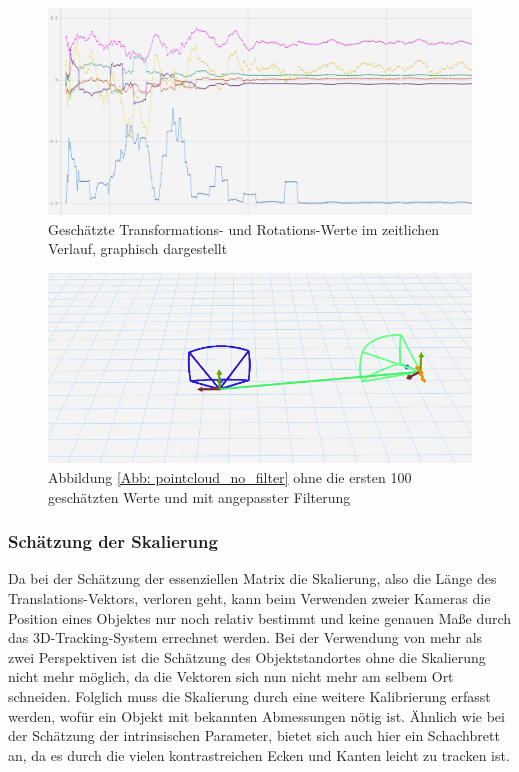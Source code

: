 \documentclass[12pt, ngerman]{article}
\begin{document}
\begin{figure}[hbtp!]
    \includegraphics[width=\textwidth]{calibration_graph_white.png}
    \caption{Geschätzte Transformations- und Rotations-Werte im zeitlichen Verlauf, graphisch dargestellt}
    \label{Abb: calibration_graph}
\end{figure}

\vspace{10pt}

\begin{figure}[hbtp!]
    \includegraphics[width=\textwidth]{pointcloud_with_filter.png}
    \caption{Abbildung \ref{Abb: pointcloud_no_filter} ohne die ersten 100 geschätzten Werte und mit angepasster Filterung}
    \label{Abb: pointcloud_with_filter}
\end{figure}

\vspace{10pt}

\subsubsection{Schätzung der Skalierung}
Da bei der Schätzung der essenziellen Matrix die Skalierung, also die Länge des
Translations-Vektors, verloren geht, kann beim Verwenden zweier Kameras die
Position eines Objektes nur noch relativ bestimmt und keine genauen Maße durch
das 3D-Tracking-System errechnet werden. Bei der Verwendung von mehr als zwei
Perspektiven ist die Schätzung des Objektstandortes ohne die Skalierung nicht
mehr möglich, da die Vektoren sich nun nicht mehr am selbem Ort schneiden.
Folglich muss die Skalierung durch eine weitere Kalibrierung erfasst werden,
wofür ein Objekt mit bekannten Abmessungen nötig ist. Ähnlich wie bei der
Schätzung der intrinsischen Parameter, bietet sich auch hier ein Schachbrett an,
da es durch die vielen kontrastreichen Ecken und Kanten leicht zu tracken ist.
\end{document}
